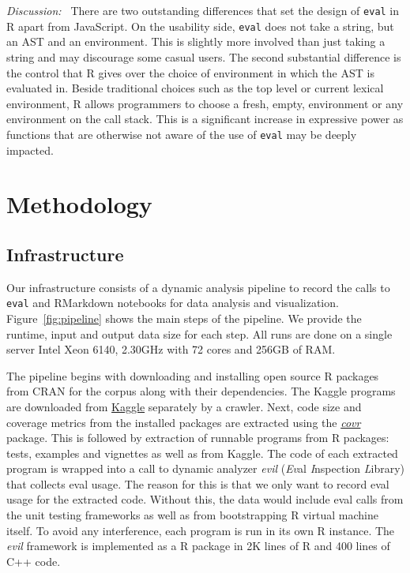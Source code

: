 \documentclass[USenglish,cleveref, autoref, thm-restate]{lipics-v2019}
\newcommand{\eval}{\texttt{eval}\xspace}
\newcommand{\covr}{\emph{covr}\xspace}
\begin{document}
\medskip\emph{Discussion:~} There are two outstanding differences that set
the design of \eval in R apart from JavaScript. On the usability side, \eval
does not take a string, but an AST and an environment. This is slightly more
involved than just taking a string and may discourage some casual users.
The second substantial difference is the control that R gives over the
choice of environment in which the AST is evaluated in. Beside traditional
choices such as the top level or current lexical environment, R allows
programmers to choose a fresh, empty, environment or any environment on the
call stack. This is a significant increase in expressive power as functions
that are otherwise not aware of the use of \eval may be deeply impacted.

\section{Methodology}

\subsection{Infrastructure}

Our infrastructure consists of a dynamic analysis pipeline to record the
calls to \eval and RMarkdown notebooks for data analysis and visualization.
Figure~\ref{fig:pipeline} shows the main steps of the pipeline. We provide
the runtime, input and output data size for each step. All runs are done on
a single server Intel Xeon 6140, 2.30GHz with 72 cores and 256GB of RAM.

The pipeline begins with downloading and installing open source R packages
from CRAN for the corpus along with their dependencies. The Kaggle programs
are downloaded from \href{http://www.kaggle.com}{Kaggle} separately by a
crawler.  Next, code size and coverage metrics from the installed packages
are extracted using the \href{ https://github.com/r-lib/covr}{\covr}
package. This is followed by extraction of runnable programs from R
packages: tests, examples and vignettes as well as from Kaggle. The code of
each extracted program is wrapped into a call to dynamic analyzer
\emph{evil} (\emph{Ev}al \emph{I}nspection \emph{L}ibrary) that collects eval
usage. The reason for this is that we only want to record eval usage for the
extracted code. Without this, the data would include eval calls from the
unit testing frameworks as well as from bootstrapping R virtual machine
itself. To avoid any interference, each program is run in its own R
instance. The \emph{evil} framework is implemented as a R package in 2K lines of
R and 400 lines of C++ code.
\end{document}
